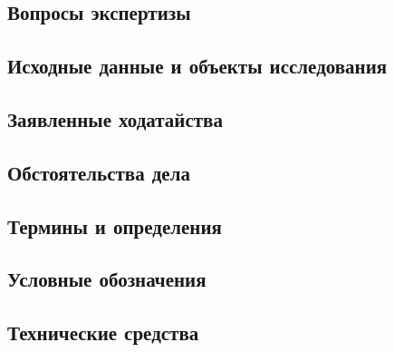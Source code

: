 


	
	
	
	
	
	
	
	
	\thispagestyle{empty}  %
	
	
	\subsection{Вопросы экспертизы}
	
	
	\subsection{Исходные данные и объекты исследования}
	
	
	\subsection{Заявленные ходатайства}
	
	
	\subsection{Обстоятельства дела}
	
	
	
	\printbibliography
	
	
	\subsection{Термины и определения}
	
	
	\subsection{Условные обозначения}
	
	
	\subsection{Технические средства}
	
	
